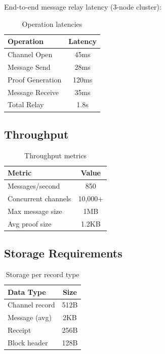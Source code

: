 \documentclass[11pt,twocolumn]{article}
\begin{document}
End-to-end message relay latency (3-node cluster):

\begin{table}[h]
\centering
\begin{tabular}{|l|c|}
\hline
\textbf{Operation} & \textbf{Latency} \\
\hline
Channel Open & 45ms \\
Message Send & 28ms \\
Proof Generation & 120ms \\
Message Receive & 35ms \\
Total Relay & 1.8s \\
\hline
\end{tabular}
\caption{Operation latencies}
\end{table}

\subsection{Throughput}

\begin{table}[h]
\centering
\begin{tabular}{|l|c|}
\hline
\textbf{Metric} & \textbf{Value} \\
\hline
Messages/second & 850 \\
Concurrent channels & 10,000+ \\
Max message size & 1MB \\
Avg proof size & 1.2KB \\
\hline
\end{tabular}
\caption{Throughput metrics}
\end{table}

\subsection{Storage Requirements}

\begin{table}[h]
\centering
\begin{tabular}{|l|c|}
\hline
\textbf{Data Type} & \textbf{Size} \\
\hline
Channel record & 512B \\
Message (avg) & 2KB \\
Receipt & 256B \\
Block header & 128B \\
\hline
\end{tabular}
\caption{Storage per record type}
\end{table}
\end{document}
